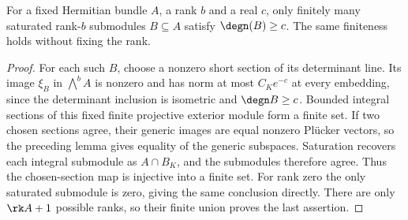 \begin{lemma}
\label{lem:degree-finiteness}
\leanok
For a fixed Hermitian bundle $A$, a rank $b$ and a real $c$, only finitely
many saturated rank-$b$ submodules $B\subseteq A$ satisfy $\degn(B)\geq c$.
The same finiteness holds without fixing the rank.
\end{lemma}
\begin{proof}
For each such $B$, choose a nonzero short section of its determinant line.
Its image $\xi_B$ in $\bigwedge^b A$ is nonzero and has norm at most
$C_K e^{-c}$ at every embedding, since the determinant inclusion is
isometric and $\degn B\geq c$. Bounded integral sections of this fixed
finite projective exterior module form a finite set. If two chosen sections
agree, their generic images are equal nonzero Pl\"ucker vectors, so the
preceding lemma gives equality of the generic subspaces. Saturation recovers
each integral submodule as $A\cap B_K$, and the submodules therefore agree.
Thus the chosen-section map is injective into a finite set. For rank zero
the only saturated submodule is zero, giving the same conclusion directly.
There are only $\rk A+1$ possible ranks, so their finite union proves the
last assertion.
\end{proof}

